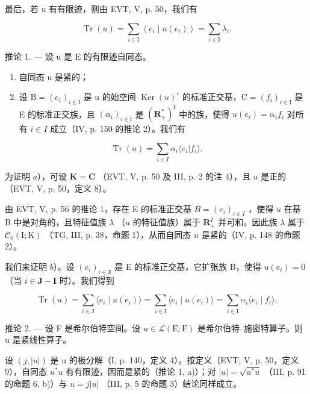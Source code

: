 最后，若 u 有有限迹，则由 EVT, V, p. 50，我们有

\[
\operatorname{Tr} (u) = \sum_ {i \in \mathrm{I}} \left\langle e _ {i} \mid u \left(e _ {i}\right) \right\rangle = \sum_ {i \in \mathrm{I}} \lambda_ {i}.
\]

推论 1. --- 设 u 是 E 的有限迹自同态。

\begin{enumerate}
\def\labelenumi{\alph{enumi})}
\item
  自同态 u 是紧的；
\item
  设 \(\mathrm{B} = (e_i)_{i \in \mathrm{I}}\) 是 u 的始空间 \(\operatorname{Ker}(u)^{\circ}\) 的标准正交基，\(\mathrm{C} = (f_i)_{i \in \mathrm{I}}\) 是 E 的标准正交族，且 \((\alpha_i)_{i \in \mathrm{I}}\) 是 \((\mathbf{R}_+^*)^{\mathrm{I}}\) 中的族，使得 \(u(e_i) = \alpha_i f_i\) 对所有 \(i \in I\) 成立（IV, p. 150 的推论 2）。我们有
\end{enumerate}

\[
\operatorname{Tr} (u) = \sum_ {i \in I} \alpha_ {i} \langle e _ {i} | f _ {i} \rangle .
\]

为证明 \(a\)），可设 \(\mathbf{K} = \mathbf{C}\) （EVT, V, p. 50 及 III, p. 2 的注 4），且 \(u\) 是正的（EVT, V, p. 50，定义 8）。

由 EVT, V, p. 56 的推论 1，存在 E 的标准正交基 \(B = (e_i)_{i \in I}\) ，使得 \(u\) 在基 B 中是对角的，且特征值族 \(\lambda\) （\(u\) 的特征值族）属于 \(\mathbf{R}_+^I\) 并可和。因此族 \(\lambda\) 属于 \(\mathcal{C}_0(\mathrm{I};\mathrm{K})\) （TG, III, p. 38，命题 1），从而自同态 \(u\) 是紧的（IV, p. 148 的命题 2）。

我们来证明 \(b\)）。设 \((e_i)_{i \in \mathbf{J}}\) 是 E 的标准正交基，它扩张族 B，使得 \(u(e_i) = 0\) （当 \(i \in \mathbf{J} - \mathbf{I}\) 时）。我们得到

\[
\operatorname{Tr} (u) = \sum_ {i \in \mathrm{J}} \langle e _ {i} \mid u (e _ {i}) \rangle = \sum_ {i \in \mathrm{I}} \langle e _ {i} \mid u (e _ {i}) \rangle = \sum_ {i \in \mathrm{I}} \alpha_ {i} \langle e _ {i} \mid f _ {i} \rangle .
\]

推论 2. --- 设 F 是希尔伯特空间。设 \(u \in \mathcal{L}(\mathrm{E};\mathrm{F})\) 是希尔伯特--施密特算子。则 u 是紧线性算子。

设 \((j,|u|)\) 是 u 的极分解（I, p. 140，定义 4）。按定义（EVT, V, p. 50，定义 9），自同态 \(u^{*}u\) 有有限迹，因而是紧的（推论 1, a)）；对 \(|u|=\sqrt{u^{*}u}\) （III, p. 91 的命题 6, b)）与 \(u=j|u|\) （III, p. 5 的命题 3）结论同样成立。

